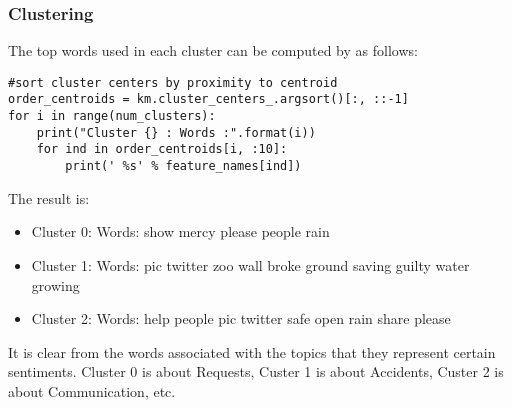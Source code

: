 \begin{frame}[fragile]\frametitle{Clustering}
The top words used in each cluster can be computed by as follows:
  \begin{lstlisting}
#sort cluster centers by proximity to centroid
order_centroids = km.cluster_centers_.argsort()[:, ::-1]
for i in range(num_clusters):
    print("Cluster {} : Words :".format(i))
    for ind in order_centroids[i, :10]: 
        print(' %s' % feature_names[ind])
  \end{lstlisting}
  The result is:
  \begin{itemize}
  \item 
    Cluster 0: Words: show mercy please people rain
  \item     Cluster 1: Words: pic twitter zoo wall broke ground saving guilty water growing
  \item     Cluster 2: Words: help people pic twitter safe open rain share please
    \end{itemize}
        It is clear from the words associated with the topics that they represent certain sentiments. Cluster 0 is about Requests, Custer 1 is about Accidents, Custer 2 is about Communication, etc.
\end{frame}


